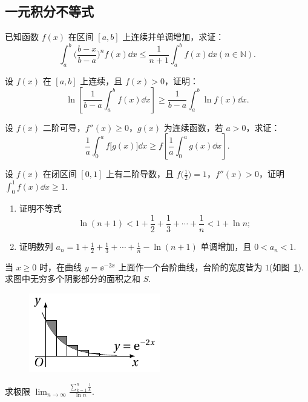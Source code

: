 \subsection{一元积分不等式}

	\begin{ti}
		已知函数 $f(x)$ 在区间 $[a,b]$ 上连续并单调增加，求证：
		\[
			\int_{a}^{b} \Biggl( \frac{b - x}{b - a} \Biggr)^{n} f(x) \dd{x} \leq \frac{1}{n + 1} \int_{a}^{b} f(x) \dd{x} (n \in \mathbb N).
		\]
	\end{ti}

	\begin{ti}
		设 $f(x)$ 在 $[a,b]$ 上连续，且 $f(x) > 0$，证明：
		\[
			\ln \left[ \frac{1}{b - a} \int_{a}^{b} f(x) \dd{x} \right] \geq \frac{1}{b - a} \int_{a}^{b} \ln f(x) \dd{x}.
		\]
	\end{ti}

	\begin{ti}
		设 $f(x)$ 二阶可导，$f''(x) \geq 0$，$g(x)$ 为连续函数，若 $a > 0$，求证：
		\[
			\frac{1}{a} \int_{0}^{a} f\bigl[g(x)\bigr] \dd{x} \geq f\left[ \frac{1}{a} \int_{0}^{a} g(x) \dd{x} \right].
		\]
	\end{ti}

	\begin{ti}
		设 $f(x)$ 在闭区间 $[0,1]$ 上有二阶导数，且 $f\bigl( \frac{1}{2} \bigr) = 1$，$f''(x) > 0$，证明 $\int_{0}^{1} f(x) \dd{x} \geq 1$.
	\end{ti}

	\begin{ti}
		\begin{enumerate}
			\item 证明不等式
			\[
				\ln(n+1) < 1 + \frac{1}{2} + \frac{1}{3} + \cdots + \frac{1}{n} < 1 + \ln n;
			\]
			\item 证明数列 $a_{n} = 1 + \frac{1}{2} + \frac{1}{3} + \cdots + \frac{1}{n} - \ln(n+1)$ 单调增加，且 $0 < a_{n} < 1$.
		\end{enumerate}
	\end{ti}

	\begin{ti}
		当 $x \geq 0$ 时，在曲线 $y = \ee^{-2x}$ 上面作一个台阶曲线，台阶的宽度皆为 $1$(如图~\ref{fig:1.3.5}). 求图中无穷多个阴影部分的面积之和 $S$.
		\begin{figure}[htbp]
			\centering
			\includegraphics[scale=1]{figure/fig1-3-5.pdf}
			\caption{}\label{fig:1.3.5}
		\end{figure}
	\end{ti}

	\begin{ti}
		求极限 $\lim_{n \to \infty} \frac{\sum_{k=1}^{n} \frac{1}{k}}{\ln n}$.
	\end{ti}